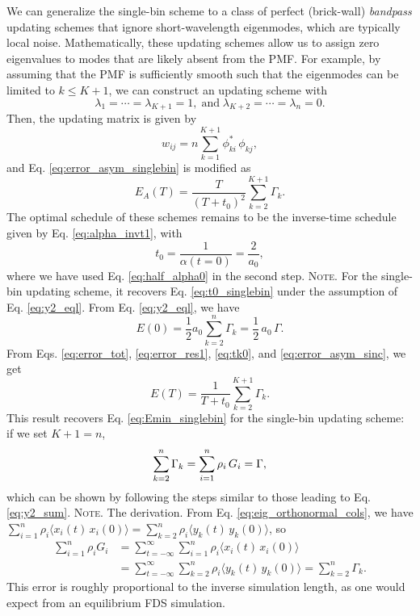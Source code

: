 \documentclass[reprint, superscriptaddress, floatfix]{revtex4-1}
\newcommand{\note}[1]{{\color{DarkGreen}\footnotesize \textsc{Note.} #1}}
\newcommand{\Err}{E}
\begin{document}
We can generalize
the single-bin scheme to a class of
perfect (brick-wall) \emph{bandpass} updating schemes
that ignore short-wavelength eigenmodes,
which are typically local noise.
%
Mathematically, these updating schemes
allow us to assign zero eigenvalues
to modes that are likely absent from the PMF.
%
For example,
by assuming
that the PMF is sufficiently smooth
such that the eigenmodes can be limited to $k \le K + 1$,
%
we can construct an updating scheme with
$$
\lambda_1 = \cdots = \lambda_{K+1} = 1,
\mathrm{\; and \;}
\lambda_{K+2} = \cdots = \lambda_n = 0.
$$
%
Then, the updating matrix is given by
%
$$w_{ij} = n \sum_{k=1}^{K+1} \phi_{ki}^* \, \phi_{kj},$$
%
and Eq. \eqref{eq:error_asym_singlebin} is modified as
%
\begin{equation}
  \Err_A(T)
  =
  \frac {       T     }
        { (T + t_0)^2 }
  \sum_{ k = 2 }^{K+1}
    \Gamma_k.
\label{eq:error_asym_sinc}
\end{equation}
%
The optimal schedule of these schemes
remains to be the inverse-time schedule
given by Eq. \eqref{eq:alpha_invt1},
%
with
%
\begin{equation}
  t_0
  =
  \frac{        1      }
       { \alpha(t = 0) }
  =
  \frac{  2  }
       { a_0 }
  ,
\label{eq:t0_sinc}
\end{equation}
%
where we have used Eq. \eqref{eq:half_alpha0}
in the second step.
%
\note{
For the single-bin updating scheme,
it recovers Eq. \eqref{eq:t0_singlebin}
under the assumption of Eq. \eqref{eq:y2_eql}.
%
From Eq. \eqref{eq:y2_eql}, we have
$$E(0) = \frac{1}{2} a_0 \sum_{k=2}^n \Gamma_k = \frac{1}{2} \, a_0 \, \Gamma.$$
}
%
From Eqs. \eqref{eq:error_tot},
\eqref{eq:error_res1},
\eqref{eq:tk0},
and
\eqref{eq:error_asym_sinc},
we get
%
\begin{equation}
  \Err(T)
  =
  \frac{   1     }
       { T + t_0 }
  \sum_{ k = 2 }^{ K + 1 }
    \Gamma_k
  .
\label{eq:error_sinc}
\end{equation}
%
This result recovers Eq. \eqref{eq:Emin_singlebin}
for the single-bin updating scheme:
if we set $K + 1 = n$,
%
\begin{equation}
  \sum_{k=2}^n \Gamma_k
  = \sum_{i=1}^n \rho_i \, G_i = \Gamma
  ,
  \notag
\end{equation}
which can be shown by following the steps
similar to those leading to Eq. \eqref{eq:y2_sum}.
%
%
%
\note{The derivation.
From Eq. \eqref{eq:eig_orthonormal_cols}, we have
$\sum_{i=1}^n \rho_i \langle x_i(t) \, x_i(0) \rangle
=\sum_{k=2}^n \rho_i \langle y_k(t) \, y_k(0) \rangle$,
so
\begin{align*}
\sum_{i=1}^n \rho_i G_i
&=\sum_{t=-\infty}^\infty\sum_{i=1}^n \rho_i \langle x_i(t) \, x_i(0) \rangle \\
&=\sum_{t=-\infty}^\infty\sum_{k=2}^n \rho_i \langle y_k(t) \, y_k(0) \rangle
=\sum_{k=2}^n \Gamma_k.
\end{align*}
}
%
This error is roughly proportional to the inverse simulation length,
as one would expect from an equilibrium FDS simulation.
\end{document}
